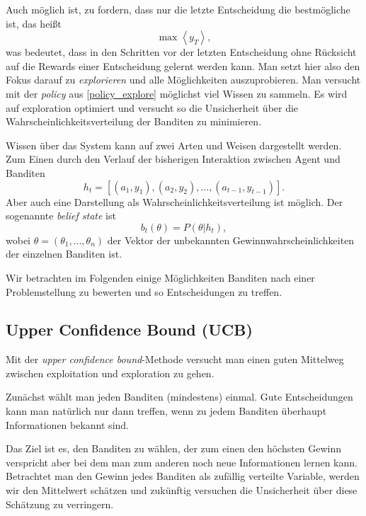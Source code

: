 \documentclass[ngerman]{../LaTeX-Templates/Paper/paper}
\begin{document}
Auch möglich ist, zu fordern, dass nur die letzte Entscheidung die bestmögliche ist, das heißt
\begin{equation}
	\max\left\langle y_T\right\rangle,\label{policy_explore}
\end{equation}
was bedeutet, dass in den Schritten vor der letzten Entscheidung ohne Rücksicht auf die Rewards einer Entscheidung gelernt werden kann. Man setzt hier also den Fokus darauf zu \emph{explorieren} und alle Möglichkeiten auszuprobieren.
Man versucht mit der \emph{policy} aus \autoref{policy_explore} möglichst viel Wissen zu sammeln. Es wird auf exploration optimiert und versucht so die Unsicherheit über die Wahrscheinlichkeitsverteilung der Banditen zu minimieren.


Wissen über das System kann auf zwei Arten und Weisen dargestellt werden. Zum Einen durch den Verlauf der bisherigen Interaktion zwischen Agent und Banditen
\begin{equation*}
	h_t=[(a_1,y_1),(a_2,y_2),\ldots,(a_{t-1},y_{t-1})].
\end{equation*}
Aber auch eine Darstellung als Wahrscheinlichkeitsverteilung ist möglich. Der sogenannte \emph{belief state} ist
\begin{equation*}
	b_t(\theta)=P(\theta|h_t),
\end{equation*}
wobei $\theta=(\theta_1,\ldots,\theta_n)$ der Vektor der unbekannten Gewinnwahrscheinlichkeiten der einzelnen Banditen ist.




Wir betrachten im Folgenden einige Möglichkeiten Banditen nach einer Problemstellung zu bewerten und so Entscheidungen zu treffen.
\subsection{Upper Confidence Bound (UCB)}
Mit der \emph{upper confidence bound}-Methode versucht man einen guten Mittelweg zwischen exploitation und exploration zu gehen. 

Zunächst wählt man jeden Banditen (mindestens) einmal. Gute Entscheidungen kann man natürlich nur dann treffen, wenn zu jedem Banditen überhaupt Informationen bekannt sind. 

Das Ziel ist es, den Banditen zu wählen, der zum einen den höchsten Gewinn verspricht aber bei dem man zum anderen noch neue Informationen lernen kann.
Betrachtet man den Gewinn jedes Banditen als zufällig verteilte Variable, werden wir den Mittelwert schätzen und zukünftig versuchen die Unsicherheit über diese Schätzung zu verringern.
\end{document}
